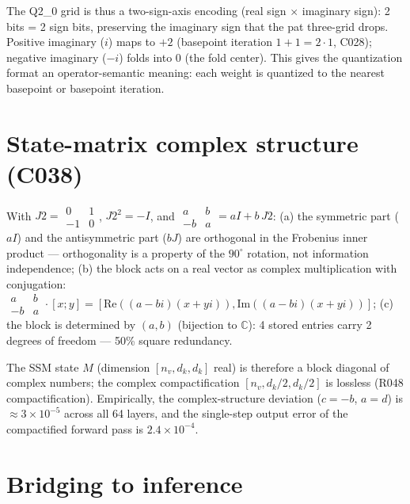 \documentclass[sigplan,10pt,anonymous,review]{acmart}
\begin{document}
The Q2\_0 grid is thus a two-sign-axis encoding (real sign $\times$ imaginary
sign): 2 bits = 2 sign bits, preserving the imaginary sign that the pat
three-grid drops. Positive imaginary ($i$) maps to $+2$ (basepoint iteration
$1+1 = 2\cdot 1$, C028); negative imaginary ($-i$) folds into $0$ (the fold
center). This gives the quantization format an operator-semantic meaning:
each weight is quantized to the nearest basepoint or basepoint iteration.

\section{State-matrix complex structure (C038)}

\begin{theorem}[C038]
With $J2 = \begin{smallmatrix}0&1\\-1&0\end{smallmatrix}$, $J2^2 = -I$, and
$\begin{smallmatrix}a&b\\-b&a\end{smallmatrix} = aI + b\,J2$:
(a) the symmetric part ($aI$) and the antisymmetric part ($bJ$) are orthogonal
in the Frobenius inner product --- orthogonality is a property of the $90^\circ$
rotation, not information independence; (b) the block acts on a real vector as
complex multiplication with conjugation:
$\begin{smallmatrix}a&b\\-b&a\end{smallmatrix}\cdot[x;y] =
[\mathrm{Re}((a-bi)(x+yi)), \mathrm{Im}((a-bi)(x+yi))]$; (c) the block is
determined by $(a,b)$ (bijection to $\mathbb C$): 4 stored entries carry
2 degrees of freedom --- 50\% square redundancy.
\end{theorem}

The SSM state $M$ (dimension $[n_v, d_k, d_k]$ real) is therefore a block
diagonal of complex numbers; the complex compactification
$[n_v, d_k/2, d_k/2]$ is lossless (R048 compactification). Empirically, the
complex-structure deviation ($c = -b$, $a = d$) is $\approx 3\times10^{-5}$
across all 64 layers, and the single-step output error of the compactified
forward pass is $2.4\times10^{-4}$.

\section{Bridging to inference}
\end{document}
